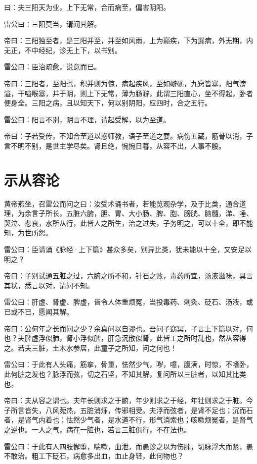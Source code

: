 \documentclass{article}%
\begin{document}
曰：夫三阳天为业，上下无常，合而病至，偏害阴阳。

雷公曰：三阳莫当，请闻其解。

帝曰：三阳独至者，是三阳并至，并至如风雨，上为巅疾，下为漏病，外无期，内无正，不中经纪，诊无上下，以书别。

雷公曰：臣治疏愈，说意而已。

帝曰：三阳者，至阳也，积并则为惊，病起疾风，至如礔砺，九窍皆塞，阳气滂溢，干嗌喉塞，并于阴，则上下无常，薄为肠澼，此谓三阳直心，坐不得起，卧者便身全。三阳之病，且以知天下，何以别阴阳，应四时，合之五行。

雷公曰：阳言不别，阴言不理，请起受解，以为至道。

帝曰：子若受传，不知合至道以惑师教，语子至道之要。病伤五藏，筋骨以消，子言不明不别，是世主学尽矣。肾且绝，惋惋日暮，从容不出，人事不殷。
\section{示从容论}
黄帝燕坐，召雷公而问之曰：汝受术诵书者，若能览观杂学，及于比类，通合道理，为余言子所长，五脏六腑，胆、胃、大小肠、脾、胞、膀胱、脑髓，涕、唾、哭泣、悲哀，水所从行，此皆人之所生，治之过失，子务明之，可以十全，即不能知，为世所怨。

雷公曰：臣请诵《脉经·上下篇》甚众多矣，别异比类，犹未能以十全，又安足以明之？

帝曰：子别试通五脏之过，六腑之所不和，针石之败，毒药所宜，汤液滋味，具言其状，悉言以对，请问不知。

雷公曰：肝虚、肾虚、脾虚，皆令人体重烦冤，当投毒药、刺灸、砭石、汤液，或已或不已，愿闻其解。

帝曰：公何年之长而问之少？余真问以自谬也。吾问子窈冥，子言上下篇以对，何也？夫脾虚浮似肺，肾小浮似脾，肝急沉散似肾，此皆工之所时乱也，然从容得之。若夫三脏，土木水参居，此童子之所知，问之何也！

雷公曰：于此有人头痛，筋挛，骨重，怯然少气，哕，噫，腹满，时惊，不嗜卧，此何脏之发也？脉浮而弦，切之石坚，不知其解，复问所以三脏者，以知其比类也。

帝曰：夫从容之谓也。夫年长则求之于腑，年少则求之于经，年壮则求之于脏。今子所言皆失，八风菀热，五脏消烁，传邪相受。夫浮而弦者，是肾不足也；沉而石者，是肾气内着也；怯然少气者，是水道不行，形气消索也；咳嗽烦冤者，是肾气之逆也。一人之气，病在一脏也，若言三脏俱行，不在法也。

雷公曰：于此有人四肢懈堕，喘嗽，血泄，而愚诊之以为伤肺，切脉浮大而紧，愚不敢治。粗工下砭石，病愈多出血，血止身轻，此何物也？
\end{document}
